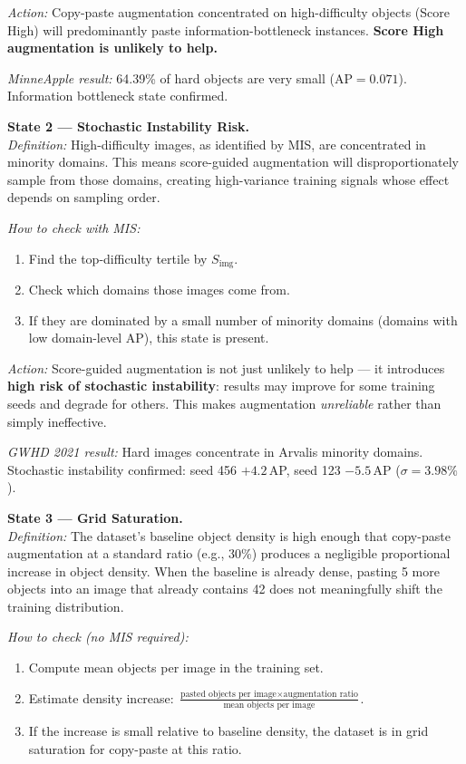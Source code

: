 \documentclass[10pt, a4paper]{article}
\begin{document}
\textit{Action:} Copy-paste augmentation concentrated on high-difficulty
objects (Score High) will predominantly paste information-bottleneck
instances. \textbf{Score High augmentation is unlikely to help.}

\textit{MinneApple result:} 64.39\% of hard objects are very small
(AP$=0.071$). Information bottleneck state confirmed.

\medskip
\noindent\textbf{State 2 --- Stochastic Instability Risk.}\\
\textit{Definition:} High-difficulty images, as identified by MIS,
are concentrated in minority domains.
This means score-guided augmentation will disproportionately sample
from those domains, creating high-variance training signals whose
effect depends on sampling order.

\textit{How to check with MIS:}
\begin{enumerate}[nosep, leftmargin=*]
\item Find the top-difficulty tertile by $S_{\text{img}}$.
\item Check which domains those images come from.
\item If they are dominated by a small number of minority domains
  (domains with low domain-level AP), this state is present.
\end{enumerate}

\textit{Action:} Score-guided augmentation is not just unlikely to help ---
it introduces \textbf{high risk of stochastic instability}: results may
improve for some training seeds and degrade for others.
This makes augmentation \emph{unreliable} rather than simply ineffective.

\textit{GWHD 2021 result:} Hard images concentrate in Arvalis minority
domains. Stochastic instability confirmed: seed 456 $+4.2$\,AP,
seed 123 $-5.5$\,AP ($\sigma=3.98\%$).

\medskip
\noindent\textbf{State 3 --- Grid Saturation.}\\
\textit{Definition:} The dataset's baseline object density is high enough
that copy-paste augmentation at a standard ratio (e.g., 30\%) produces
a negligible proportional increase in object density.
When the baseline is already dense, pasting 5 more objects into an
image that already contains 42 does not meaningfully shift the
training distribution.

\textit{How to check (no MIS required):}
\begin{enumerate}[nosep, leftmargin=*]
\item Compute mean objects per image in the training set.
\item Estimate density increase:
  $\frac{\text{pasted objects per image} \times \text{augmentation ratio}}%
  {\text{mean objects per image}}$.
\item If the increase is small relative to baseline density,
  the dataset is in grid saturation for copy-paste at this ratio.
\end{enumerate}
\end{document}
